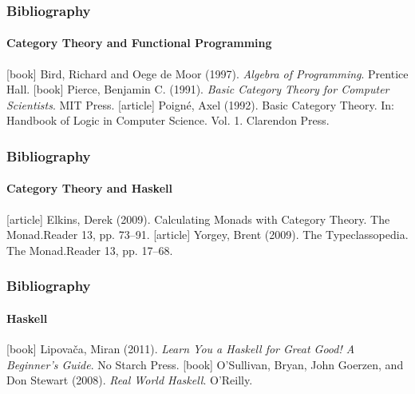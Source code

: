 \documentclass{beamer}
\begin{document}

\begin{frame}
  \frametitle{Bibliography}
  \framesubtitle{Category Theory and Functional Programming}

  \begin{thebibliography}{Bird and de Moor 1997}
  [book]
    Bird, Richard and Oege de Moor (1997).
    \newblock \emph{Algebra of Programming}.
    \newblock Prentice Hall.
  [book]
    Pierce, Benjamin C. (1991).
    \newblock \emph{Basic Category Theory for Computer Scientists}.
    \newblock MIT Press.
  [article]
    Poigné, Axel (1992).
    \newblock Basic Category Theory.
    \newblock In: Handbook of Logic in Computer Science. Vol. 1.
    \newblock Clarendon Press.
  \end{thebibliography}

\end{frame}


\begin{frame}
  \frametitle{Bibliography}
  \framesubtitle{Category Theory and Haskell}

  \begin{thebibliography}{Elkins 2009}
  [article]
    Elkins, Derek (2009).
    \newblock Calculating Monads with Category Theory.
    \newblock The Monad.Reader 13, pp. 73--91.
  [article]
    Yorgey, Brent (2009).
    \newblock The Typeclassopedia.
    \newblock The Monad.Reader 13, pp. 17--68.
  \end{thebibliography}

\end{frame}


\begin{frame}
  \frametitle{Bibliography}
  \framesubtitle{Haskell}

  \begin{thebibliography}{O'Sullivan, Goerzen, and Stewart 2008}
  [book]
    Lipovača, Miran (2011).
    \newblock \emph{Learn You a Haskell for Great Good! A Beginner's Guide}.
    \newblock No Starch Press.
  [book]
    O'Sullivan, Bryan, John Goerzen, and Don Stewart (2008).
    \newblock \emph{Real World Haskell}.
    \newblock O'Reilly.
  \end{thebibliography}

\end{frame}
\end{document}
